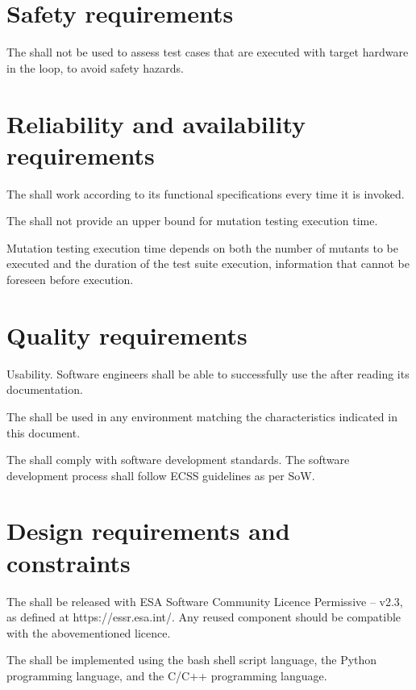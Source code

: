 \section{Safety requirements}

\RQ{} The \FAQAS shall not be used to assess test cases that are executed with target hardware in the loop, to avoid safety hazards.

\section{Reliability and availability requirements}

\RQ{} The \FAQAS shall work according to its functional specifications every time it is invoked.


\RQ{} The \FAQAS shall not provide an upper bound for mutation testing execution time.

\remark Mutation testing execution time depends on both the number of mutants to be executed and the duration of the test suite execution, information that cannot be foreseen before execution.

\section{Quality requirements}

\RQ{} Usability. Software engineers shall be able to successfully use the \FAQAS after reading its documentation.

\RQ{} The \FAQAS shall be used in any environment matching the characteristics indicated in this document.

\RQ{} The \FAQAS shall comply with software development standards. The software development process shall follow ECSS guidelines as per SoW.


\section{Design requirements and constraints}

\RQ{} The \FAQAS shall be released with ESA Software Community Licence Permissive – v2.3, as defined at https://essr.esa.int/. Any reused component should be compatible with the abovementioned licence.

\RQ{} The \FAQAS shall be implemented using the bash shell script language, the Python programming language, and the C/C++ programming language.

